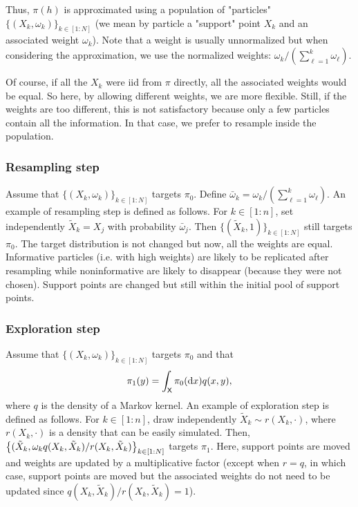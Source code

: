 \documentclass[english,graybox,envcountchap,envcountsame,sectrefs,shortlabels]{svmono}
\theoremstyle{style}
\newcommand{\eqsp}{}
\newcommand{\Xset}{\mathsf{X}}
\begin{document}
Thus, $\pi(h)$ is approximated using a population of "particles" $\{(X_k,\omega_k)\}_{k\in[1:N]}$ (we mean by particle a "support" point $X_k$ and an associated weight $\omega_k$). Note that a weight is usually unnormalized but when considering the approximation, we use the normalized weights: $\omega_k/(\sum_{\ell=1}^{k} \omega_\ell)$.

Of course, if all the $X_k$ were iid from $\pi$ directly, all the associated weights would be equal. So here, by allowing different weights, we are more flexible. Still, if the weights are too different, this is not satisfactory because only a few particles contain all the information. In that case, we prefer to resample inside the population. 

\subsubsection{Resampling step}
Assume that $\{(X_k,\omega_k)\}_{k\in[1:N]}$ targets $\pi_0$. Define $\bar \omega_k=\omega_k/(\sum_{\ell=1}^{k} \omega_\ell)$. An example of resampling step is defined as follows. For $k\in[1:n]$, set independently $\tilde X_k = X_j$ with probability $\bar \omega_j$. 
Then $\{(\tilde X_k,1)\}_{k\in[1:N]}$ still targets $\pi_0$. The target distribution is not changed but now, all the weights are equal. Informative particles (i.e. with high weights) are likely to be replicated after resampling while noninformative are likely to disappear (because they were not chosen). Support points are changed but still within the initial pool of support points.

\subsubsection{Exploration step}
Assume that $\{(X_k,\omega_k)\}_{k\in[1:N]}$ targets $\pi_0$ and that
\begin{equation} \label{eq:explor}
\pi_1(y)=\int_\Xset \pi_0(\rmd x) q(x,y)\eqsp,
\end{equation}
where $q$ is the density of a Markov kernel. An example of exploration step is defined as follows. For $k\in[1:n]$, draw independently $\tilde X_k\sim r(X_k,\cdot)$, 
where $r(X_k,\cdot)$ is a density that can be easily simulated.
Then, $\left\{ (\tilde X_k,\omega_k q(X_k,\tilde X_k)/r(X_k,\tilde X_k)\right\}_{k\in[1:N]}$ targets $\pi_1$.
Here, support points are moved and weights are updated by a multiplicative factor (except when $r=q$, in which case, support points are moved but the associated weights do not need to be updated  since $ q(X_k,\tilde X_k)/r(X_k,\tilde X_k)=1$).
\end{document}
